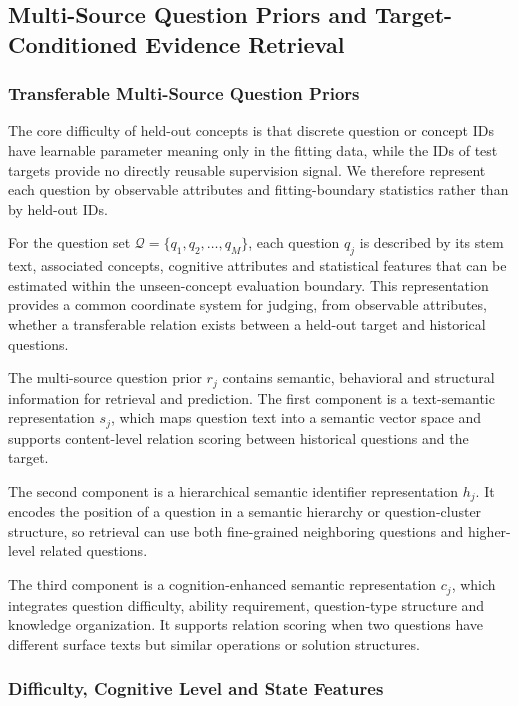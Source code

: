 \documentclass[a4paper,12pt]{article}
\numberwithin{table}{section}
\begin{document}
\subsection{Multi-Source Question Priors and Target-Conditioned Evidence Retrieval}

\subsubsection{Transferable Multi-Source Question Priors}

The core difficulty of held-out concepts is that discrete question or concept IDs have learnable parameter meaning only in the fitting data, while the IDs of test targets provide no directly reusable supervision signal. We therefore represent each question by observable attributes and fitting-boundary statistics rather than by held-out IDs.

For the question set \(\mathcal{Q}=\{q_1,q_2,\ldots,q_M\}\), each question \(q_j\) is described by its stem text, associated concepts, cognitive attributes and statistical features that can be estimated within the unseen-concept evaluation boundary. This representation provides a common coordinate system for judging, from observable attributes, whether a transferable relation exists between a held-out target and historical questions.

The multi-source question prior \(r_j\) contains semantic, behavioral and structural information for retrieval and prediction. The first component is a text-semantic representation \(s_j\), which maps question text into a semantic vector space and supports content-level relation scoring between historical questions and the target.

The second component is a hierarchical semantic identifier representation \(h_j\). It encodes the position of a question in a semantic hierarchy or question-cluster structure, so retrieval can use both fine-grained neighboring questions and higher-level related questions.

The third component is a cognition-enhanced semantic representation \(c_j\), which integrates question difficulty, ability requirement, question-type structure and knowledge organization. It supports relation scoring when two questions have different surface texts but similar operations or solution structures.

\subsubsection{Difficulty, Cognitive Level and State Features}
\end{document}
